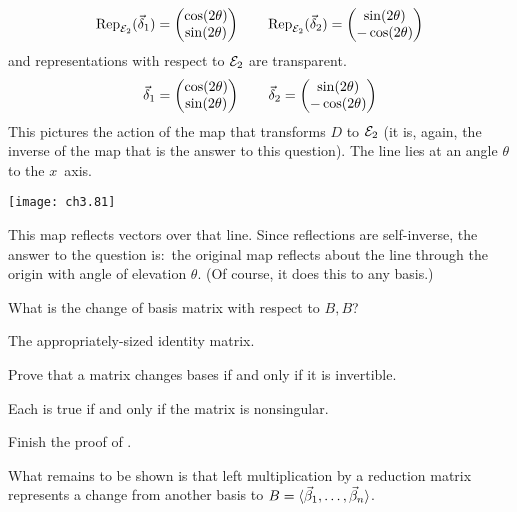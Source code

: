 \begin{exercises}
\begin{answer}
      \begin{equation*}
        \rep{\vec{\delta}_1}{\stdbasis_2}
           =\colvec{\cos(2\theta) \\ \sin(2\theta)}
        \qquad 
        \rep{\vec{\delta}_2}{\stdbasis_2}
           =\colvec{\sin(2\theta) \\ -\cos(2\theta)}
      \end{equation*}
      and representations with respect to $\stdbasis_2$ are transparent.
      \begin{equation*}
        \vec{\delta}_1=\colvec{\cos(2\theta) \\ \sin(2\theta)}
        \qquad 
        \vec{\delta}_2=\colvec{\sin(2\theta) \\ -\cos(2\theta)}
      \end{equation*}
      This pictures the action of the map that transforms $D$ to $\stdbasis_2$
      (it is, again, the inverse of the map that is the answer to
      this question).
      The line lies at an angle $\theta$ to the $x$~axis.
      \begin{center}  \small
        \texttt{[image: ch3.81]}
      \end{center}
      This map reflects vectors over that line.
      Since reflections are self-inverse, the answer to the question is:~the
      original map reflects about the line
      through the origin with angle of elevation $\theta$. 
      (Of course, it does this to any basis.)
    \end{answer}
  \recommended \item
    What is the change of basis matrix with respect to \( B,B \)?
    \begin{answer}
       The appropriately-sized identity matrix.  
     \end{answer}
  \item 
    Prove that a matrix changes bases if and only if it is invertible.
    \begin{answer}
       Each is true if and only if the matrix is nonsingular.
    \end{answer}
  \item 
    Finish the proof of .
    \begin{answer}
      What remains to be shown is that 
      left multiplication by a reduction matrix represents a
      change from another basis to \( B=\basis{\beta}{n} \).


\end{answer}
\end{exercises}
